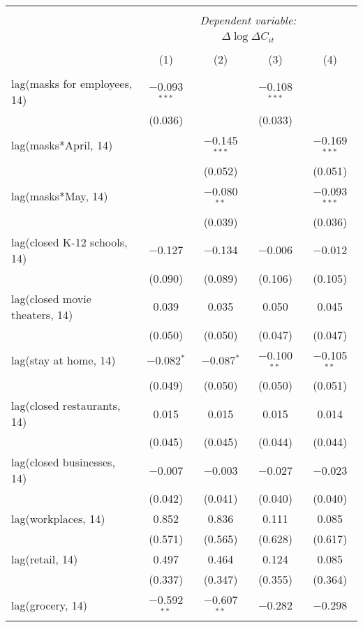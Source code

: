 \begin{tabular}{@{\extracolsep{1pt}}lcccc} 
\\[-1.8ex]\hline 
\hline \\[-1.8ex] 
 & \multicolumn{4}{c}{\textit{Dependent variable:}} \\ 
\cline{2-5} 
 & \multicolumn{4}{c}{$\Delta \log \Delta C_{it}$} \\ 
\\[-1.8ex] & (1) & (2) & (3) & (4)\\ 
\hline \\[-1.8ex] 
 lag(masks for employees, 14) & $-$0.093$^{***}$ &  & $-$0.108$^{***}$ &  \\ 
  & (0.036) &  & (0.033) &  \\ 
  lag(masks*April, 14) &  & $-$0.145$^{***}$ &  & $-$0.169$^{***}$ \\ 
  &  & (0.052) &  & (0.051) \\ 
  lag(masks*May, 14) &  & $-$0.080$^{**}$ &  & $-$0.093$^{***}$ \\ 
  &  & (0.039) &  & (0.036) \\ 
  lag(closed K-12 schools, 14) & $-$0.127 & $-$0.134 & $-$0.006 & $-$0.012 \\ 
  & (0.090) & (0.089) & (0.106) & (0.105) \\ 
  lag(closed movie theaters, 14) & 0.039 & 0.035 & 0.050 & 0.045 \\ 
  & (0.050) & (0.050) & (0.047) & (0.047) \\ 
  lag(stay at home, 14) & $-$0.082$^{*}$ & $-$0.087$^{*}$ & $-$0.100$^{**}$ & $-$0.105$^{**}$ \\ 
  & (0.049) & (0.050) & (0.050) & (0.051) \\ 
  lag(closed restaurants, 14) & 0.015 & 0.015 & 0.015 & 0.014 \\ 
  & (0.045) & (0.045) & (0.044) & (0.044) \\ 
  lag(closed businesses, 14) & $-$0.007 & $-$0.003 & $-$0.027 & $-$0.023 \\ 
  & (0.042) & (0.041) & (0.040) & (0.040) \\ 
  lag(workplaces, 14) & 0.852 & 0.836 & 0.111 & 0.085 \\ 
  & (0.571) & (0.565) & (0.628) & (0.617) \\ 
  lag(retail, 14) & 0.497 & 0.464 & 0.124 & 0.085 \\ 
  & (0.337) & (0.347) & (0.355) & (0.364) \\ 
  lag(grocery, 14) & $-$0.592$^{**}$ & $-$0.607$^{**}$ & $-$0.282 & $-$0.298 \\ 

\end{tabular}
